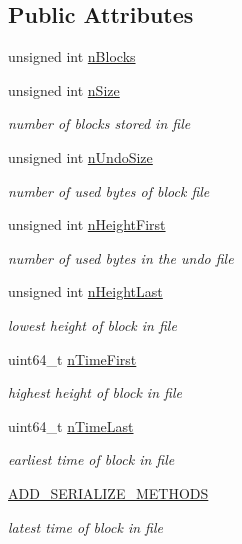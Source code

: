 \subsection*{Public Attributes}
\begin{DoxyCompactItemize}
\item 
unsigned int \hyperlink{class_c_block_file_info_adf2de4bb4d8a0a8f2116ed90f0770d03}{n\+Blocks}
\item 
unsigned int \hyperlink{class_c_block_file_info_afb13102ba49548c24812a4236851c3a9}{n\+Size}
\begin{DoxyCompactList}\small\item\em number of blocks stored in file \end{DoxyCompactList}\item 
unsigned int \hyperlink{class_c_block_file_info_ad3e555fd733ef8f38430554c2db5e9d1}{n\+Undo\+Size}
\begin{DoxyCompactList}\small\item\em number of used bytes of block file \end{DoxyCompactList}\item 
unsigned int \hyperlink{class_c_block_file_info_a66d258b11b1aec30cbacdc6130c271a8}{n\+Height\+First}
\begin{DoxyCompactList}\small\item\em number of used bytes in the undo file \end{DoxyCompactList}\item 
unsigned int \hyperlink{class_c_block_file_info_aabbcf808931e7eaf2278b3d7172fad3a}{n\+Height\+Last}
\begin{DoxyCompactList}\small\item\em lowest height of block in file \end{DoxyCompactList}\item 
uint64\+\_\+t \hyperlink{class_c_block_file_info_a0e928257d1f003ede485ce49e8cf9189}{n\+Time\+First}
\begin{DoxyCompactList}\small\item\em highest height of block in file \end{DoxyCompactList}\item 
uint64\+\_\+t \hyperlink{class_c_block_file_info_a1d12e4202474bb2f299d18d7d1f28c78}{n\+Time\+Last}
\begin{DoxyCompactList}\small\item\em earliest time of block in file \end{DoxyCompactList}\item 
\hyperlink{class_c_block_file_info_ab4daf4df00f90dee15e3a7d2cdb7a273}{A\+D\+D\+\_\+\+S\+E\+R\+I\+A\+L\+I\+Z\+E\+\_\+\+M\+E\+T\+H\+O\+D\+S}
\begin{DoxyCompactList}\small\item\em latest time of block in file \end{DoxyCompactList}\end{DoxyCompactItemize}


